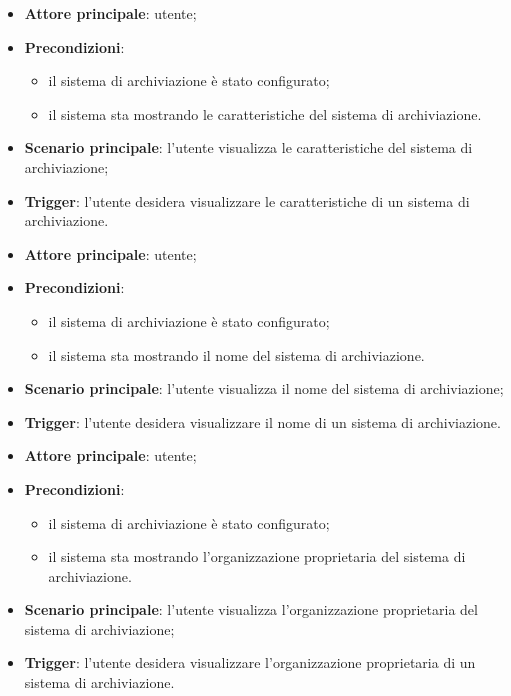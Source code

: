 \documentclass[10pt, a4paper]{article}
\begin{document}
    \begin{itemize}
        \item \textbf{Attore principale}: utente;
        \item \textbf{Precondizioni}:
        \begin{itemize}
            \item il sistema di archiviazione è stato configurato;
            \item il sistema sta mostrando le caratteristiche del sistema di archiviazione.
        \end{itemize}
        \item \textbf{Scenario principale}: l'utente visualizza le caratteristiche del sistema di archiviazione;
        \item \textbf{Trigger}: l’utente desidera visualizzare le caratteristiche di un sistema di archiviazione.
    \end{itemize}

    \begin{itemize}
        \item \textbf{Attore principale}: utente;
        \item \textbf{Precondizioni}:
        \begin{itemize}
            \item il sistema di archiviazione è stato configurato;
            \item il sistema sta mostrando il nome del sistema di archiviazione.
        \end{itemize}
        \item \textbf{Scenario principale}: l'utente visualizza il nome del sistema di archiviazione;
        \item \textbf{Trigger}: l’utente desidera visualizzare il nome di un sistema di archiviazione.
    \end{itemize}

    \begin{itemize}
        \item \textbf{Attore principale}: utente;
        \item \textbf{Precondizioni}:
        \begin{itemize}
            \item il sistema di archiviazione è stato configurato;
            \item il sistema sta mostrando l'organizzazione proprietaria del sistema di archiviazione.
        \end{itemize}
        \item \textbf{Scenario principale}: l'utente visualizza l'organizzazione proprietaria del sistema di archiviazione;
        \item \textbf{Trigger}: l’utente desidera visualizzare l'organizzazione proprietaria di un sistema di archiviazione.
    \end{itemize}
\end{document}
